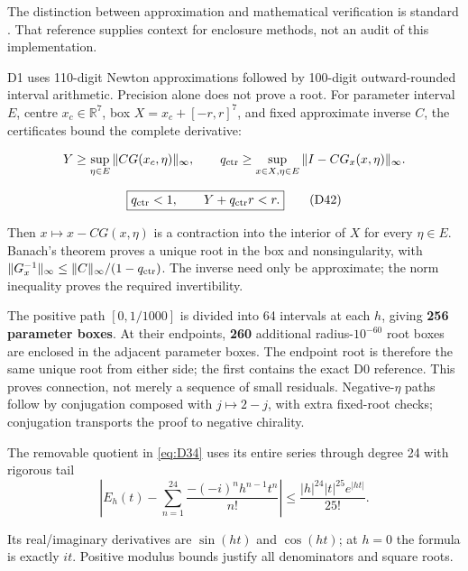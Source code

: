\documentclass[11pt,a4paper]{article}
\begin{document}
The distinction between approximation and mathematical verification is standard \cite{Rump}. That reference supplies context for enclosure methods, not an audit of this implementation.

D1 uses 110-digit Newton approximations followed by 100-digit outward-rounded interval arithmetic. Precision alone does not prove a root. For parameter interval \(E\), centre \(x_c\in\mathbb R^7\), box \(X=x_c+[-r,r]^7\), and fixed approximate inverse \(C\), the certificates bound the complete derivative:

\[
Y\ge\sup_{\eta\in E}\|CG(x_c,\eta)\|_\infty,\qquad
q_{\rm ctr}\ge\sup_{x\in X,\eta\in E}\|I-CG_x(x,\eta)\|_\infty.
\]

\[
\boxed{q_{\rm ctr}<1,\qquad Y+q_{\rm ctr}r<r.}
\tag{D42}\label{eq:D42}
\]

Then \(x\mapsto x-CG(x,\eta)\) is a contraction into the interior of \(X\) for every \(\eta\in E\). Banach's theorem proves a unique root in the box and nonsingularity, with
\(\|G_x^{-1}\|_\infty\le\|C\|_\infty/(1-q_{\rm ctr})\).
The inverse need only be approximate; the norm inequality proves the required invertibility.

The positive path \([0,1/1000]\) is divided into 64 intervals at each \(h\), giving \textbf{256 parameter boxes}. At their endpoints, \textbf{260} additional radius-\(10^{-60}\) root boxes are enclosed in the adjacent parameter boxes. The endpoint root is therefore the same unique root from either side; the first contains the exact D0 reference. This proves connection, not merely a sequence of small residuals. Negative-\(\eta\) paths follow by conjugation composed with \(j\mapsto2-j\), with extra fixed-root checks; conjugation transports the proof to negative chirality.

The removable quotient in \eqref{eq:D34} uses its entire series through degree 24 with rigorous tail
\[
\left|E_h(t)-\sum_{n=1}^{24}\frac{-(-i)^n h^{n-1}t^n}{n!}\right|
\le\frac{|h|^{24}|t|^{25}e^{|ht|}}{25!}.
\tag{D43}\label{eq:D43}
\]

Its real/\allowbreak{}imaginary derivatives are \(\sin(ht)\) and \(\cos(ht)\); at \(h=0\) the formula is exactly \(it\). Positive modulus bounds justify all denominators and square roots.
\end{document}
